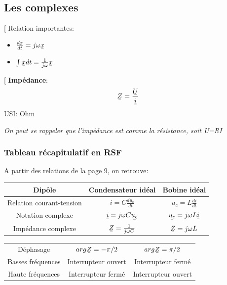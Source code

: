 \documentclass[12pt,hidelinks]{article}
\newcommand{\ubar}[1]{\text{\b{$#1$}}}
\begin{document}
    \subsection{Les complexes}
        \begin{DashedDefinition}{}[
        Relation importantes:
        \begin{itemize}
            \item $\frac{\ubar{dx}}{dt}=j \omega \ubar{x}$
            \item $\int \ubar{x} dt =\frac{1}{j \omega} \ubar{x}$
        \end{itemize}
        \end{DashedDefinition}
    
    \begin{DashedDefinition}{}[
    \textbf{Impédance}:
    \[\ubar{Z}=\frac{\ubar{U}}{\ubar{i}}\]
    USI: Ohm
    \end{DashedDefinition}
    \textit{On peut se rappeler que l'impédance est comme la résistance, soit U=RI}
    \subsubsection{Tableau récapitulatif en RSF}
    A partir des relations de la page 9, on retrouve: \\
    
    	\begin{table}[h!]
        \centering
        \begin{tabular}{c|c|c}
            Dipôle & Condensateur idéal & Bobine idéal \\\hline
            Relation courant-tension & $i=C\frac{du_c}{dt}$ & $u_c=L\frac{di}{dt}$  \\
            Notation complexe & $\ubar{i}=j\omega C \ubar{u_c}$ & $\ubar{u_c}=j \omega L \ubar{i}$ \\
            Impédance complexe & $\ubar{Z}=\frac{1}{j \omega C}$ & $\ubar{Z}=j \omega L$ \\
        \end{tabular}
        \end{table}
        \begin{table}[h!]
        \centering
        \begin{tabular}{c|c|c}
            Déphasage & $arg \ubar{Z}=-\pi/2$ & $arg \ubar{Z}=\pi/2$ \\
            Basses fréquences & Interrupteur ouvert & Interrupteur fermé \\
            Haute fréquences & Interrupteur fermé & Interrupteur ouvert
        \end{tabular}
        \end{table}
        
\end{document}
